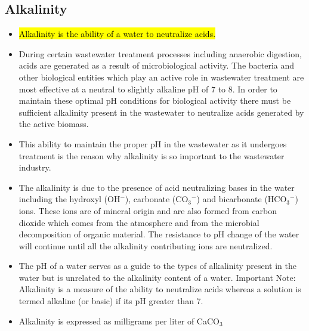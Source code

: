 \subsection{Alkalinity}	
			\begin{itemize}
				\item \hl{Alkalinity is the ability of a water to neutralize acids.}  
				\item During certain wastewater treatment processes including anaerobic digestion, acids are generated as a result of microbiological activity.  The bacteria and other biological entities which play an active role in wastewater treatment are most effective at a neutral to slightly alkaline pH of 7 to 8.  In order to maintain these optimal pH conditions for biological activity there must be sufficient alkalinity present in the wastewater to neutralize acids generated by the active biomass.
				\item This ability to maintain the proper pH in the wastewater as it undergoes treatment is the reason why alkalinity is so important to the wastewater industry.
				\item The alkalinity is due to the presence of acid neutralizing bases in the water including the hydroxyl (OH$^-$), carbonate (CO$_3$$^-$) and bicarbonate (HCO$_3$$^-$)  ions.  These ions are of mineral origin and are also formed from carbon dioxide which comes from the atmosphere and from the microbial decomposition of organic material.  The resistance to pH change of the water will continue until all the alkalinity contributing ions are neutralized.  
				\item The pH of a water serves as a guide to the types of alkalinity present in the water but is unrelated to the alkalinity content of a water.  Important Note:  Alkalinity is a measure of the ability to neutralize acids whereas a solution is termed alkaline (or basic) if its pH greater than 7. 
				\item Alkalinity is expressed as milligrams per liter of CaCO$_3$
			\end{itemize}
			
